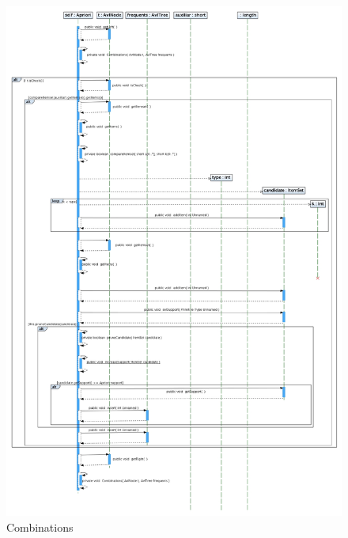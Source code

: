 \newpage
\begin{figure}
\includegraphics[width=1.1\textwidth]{Apriori/CombinationsB.jpg}
\caption{Combinations}
\end{figure}
\newpage

